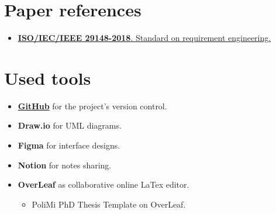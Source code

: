 \section{Paper references}
\label{sec:paper_references}%
\begin{itemize}
    \item \href{https://ieeexplore.ieee.org/document/8559686}{\textbf{ISO/IEC/IEEE 29148-2018}. Standard on requirement engineering.}
\end{itemize}


\section{Used tools}
\label{sec:used_tools}%
\begin{itemize}
    \item \href{https://github.com/MattiaBelfiore/BelfioreBenedettiBuccheri}{\textbf{GitHub}} for the project's version control.
    \item \textbf{Draw.io} for UML diagrams.
    \item \textbf{Figma} for interface designs.
    \item \textbf{Notion} for notes sharing.
    \item \textbf{OverLeaf} as collaborative online LaTex editor.
    \begin{itemize}
        \item PoliMi PhD Thesis Template on OverLeaf.
    \end{itemize}
\end{itemize}
